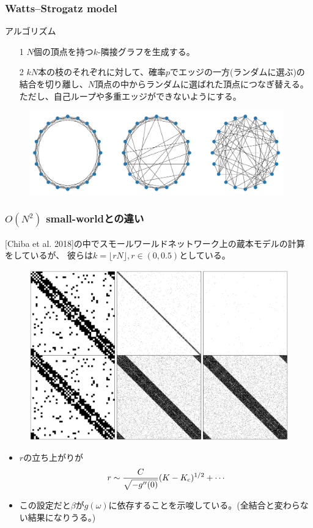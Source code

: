 \begin{frame}\frametitle{Watts--Strogatz model}
\begin{block}{アルゴリズム}
  \begin{itemize}
    \item[1] $N$個の頂点を持つ$k$-隣接グラフを生成する。
    \item[2] $kN$本の枝のそれぞれに対して、確率$p$でエッジの一方(ランダムに選ぶ)の結合を切り離し、$N$頂点の中からランダムに選ばれた頂点につなぎ替える。
    ただし、自己ループや多重エッジができないようにする。 
  \end{itemize}
\end{block}
\begin{figure}
  \begin{center}
    \includegraphics[width=11cm]{figs/ring_sw.pdf}
  \end{center}
\end{figure}
\end{frame}

\begin{frame}\frametitle{$O(N^{2})$ small-worldとの違い}
  [Chiba et al. 2018]の中でスモールワールドネットワーク上の蔵本モデルの計算をしているが、
  彼らは$k=\lfloor rN\rfloor, r\in(0,0.5)$としている。
  \begin{figure}
    \includegraphics[scale=0.15]{figs/graphon.pdf}
  \end{figure}
  \begin{itemize}
    \item $r$の立ち上がりが
    \begin{align*}
      r\sim\frac{C}{\sqrt{-g''(0)}}(K-K_{\mathrm{c}})^{1/2}+\cdots
    \end{align*}
    \item この設定だと$\beta$が$g(\omega)$に依存することを示唆している。(全結合と変わらない結果になりうる。)
  \end{itemize}
\end{frame}

